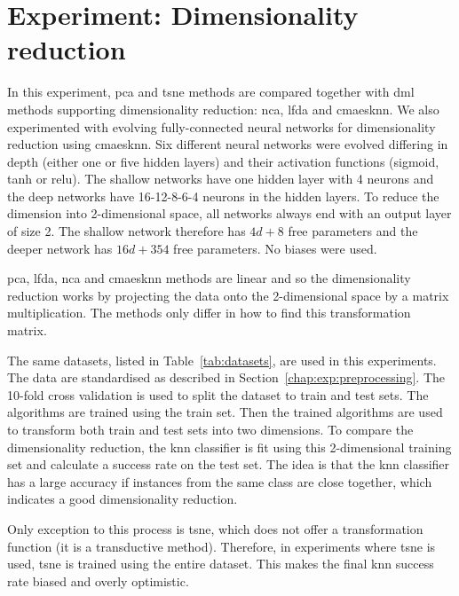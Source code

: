 \documentclass[12pt,a4paper]{report}
\begin{document}


\section{Experiment: Dimensionality reduction} \label{chap:exp:dimred}


In this experiment, \ac{pca} and \ac{tsne} methods are compared together with \ac{dml} methods supporting dimensionality reduction: \ac{nca}, \ac{lfda} and \ac{cmaesknn}. We also experimented with evolving fully-connected neural networks for dimensionality reduction using \ac{cmaesknn}. Six different neural networks were evolved differing in depth (either one or five hidden layers) and their activation functions (sigmoid, \ac{tanh} or \ac{relu}). The shallow networks have one hidden layer with 4 neurons and the deep networks have 16-12-8-6-4 neurons in the hidden layers. To reduce the dimension into 2-dimensional space, all networks always end with an output layer of size 2. The shallow network therefore has $4d+8$ free parameters and the deeper network has $16d+354$ free parameters. No biases were used.

\ac{pca}, \ac{lfda}, \ac{nca} and \ac{cmaesknn} methods are linear and so the dimensionality reduction works by projecting the data onto the 2-dimensional space by a matrix multiplication. The methods only differ in how to find this transformation matrix.

The same datasets, listed in Table~\ref{tab:datasets}, are used in this experiments. The data are standardised as described in Section~\ref{chap:exp:preprocessing}. The 10-fold cross validation is used to split the dataset to train and test sets. The algorithms are trained using the train set. Then the trained algorithms are used to transform both train and test sets into two dimensions. To compare the dimensionality reduction, the \ac{knn} classifier is fit using this 2-dimensional training set and calculate a success rate on the test set. The idea is that the \ac{knn} classifier has a large accuracy if instances from the same class are close together, which indicates a good dimensionality reduction. 

Only exception to this process is \ac{tsne}, which does not offer a transformation function (it is a transductive method). Therefore, in experiments where \ac{tsne} is used, \ac{tsne} is trained using the entire dataset. This makes the final \ac{knn} success rate biased and overly optimistic. %
\end{document}

